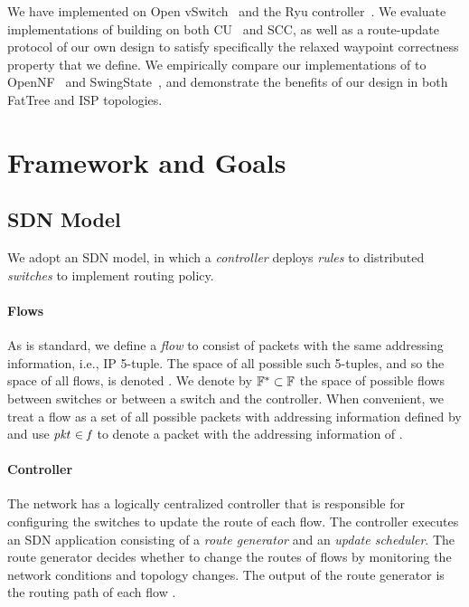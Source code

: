 We have implemented \sysname on Open vSwitch~\cite{ovs} and the Ryu
controller~\cite{ryu}.  We evaluate implementations of \sysname
building on both CU~\cite{CU} and SCC, as well as a
route-update protocol of our own design to satisfy specifically the
relaxed waypoint correctness property that we define.  We empirically
compare our implementations of \sysname to OpenNF~\cite{opennf} and
SwingState~\cite{swingstate}, and demonstrate the benefits of our
design in both FatTree and ISP topologies.


\section{Framework and Goals}
\label{sec:goals}

\subsection{SDN Model}
\label{sec:goals:network}

We adopt an SDN model, in which a \textit{controller} deploys
\textit{rules} to distributed \textit{switches} to implement routing
policy.

\paragraph{Flows}
As is standard, we define a \textit{flow} to consist of packets with
the same addressing information, i.e., IP 5-tuple.  The space of all
possible such 5-tuples, and so the space of all flows, is
denoted \flowSpace.  We denote by $\mathbb{F^{*}} \subset \mathbb{F}$
the space of possible flows between switches or between a switch and
the controller.  When convenient, we treat a flow \flowID{} as a set
of all possible packets with addressing information defined by
\flowID{} and use $\pktID{} \in \flowID{}$ to denote a packet \pktID{}
with the addressing information of \flowID{}.

\paragraph{Controller}
The network has a logically centralized controller that is responsible
for configuring the switches to update the route of each flow.  The
controller executes an SDN application consisting of a \textit{route
  generator} and an \textit{update scheduler}.  The route generator
decides whether to change the routes of flows by monitoring the
network conditions and topology changes. The output of the route
generator is the routing path of each flow \flowID{}.

